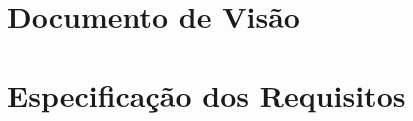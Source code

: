 \appendix

\clearpage
\addappheadtotoc
\appendixpage
\appendixtitleon

\section{Documento de Visão}


\clearpage
\addappheadtotoc

\section{Especificação dos Requisitos}


%

%